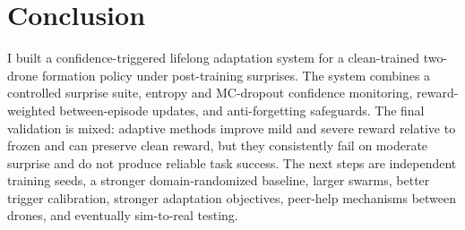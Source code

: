 \documentclass{article}
\begin{document}
\section{Conclusion}

I built a confidence-triggered lifelong adaptation system for a clean-trained two-drone formation policy under post-training surprises. The system combines a controlled surprise suite, entropy and MC-dropout confidence monitoring, reward-weighted between-episode updates, and anti-forgetting safeguards. The final validation is mixed: adaptive methods improve mild and severe reward relative to frozen and can preserve clean reward, but they consistently fail on moderate surprise and do not produce reliable task success. The next steps are independent training seeds, a stronger domain-randomized baseline, larger swarms, better trigger calibration, stronger adaptation objectives, peer-help mechanisms between drones, and eventually sim-to-real testing.

\clearpage


\end{document}
